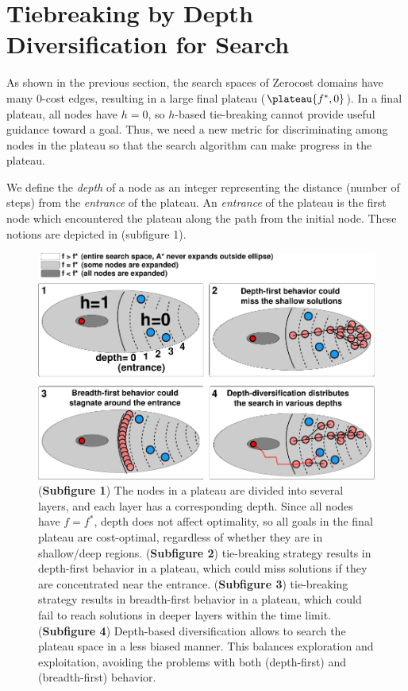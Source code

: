 
\chapter[Depth Diversification]{Tiebreaking by Depth Diversification for \astar Search}

\label{chap:tiebreaking}

As shown in the previous section, the search spaces of Zerocost domains have many 0-cost edges,
resulting in a large final plateau ($\plateau{f^*,0}$). In a final plateau,
all nodes have $h=0$, so $h$-based tie-breaking cannot provide
useful guidance toward a goal. Thus, we need a new metric for discriminating among nodes
in the plateau so that the search algorithm can make progress in the plateau.

We define the \emph{depth} of a node as an 
integer representing the distance (number of steps) from the
\emph{entrance} of the plateau.  An \emph{entrance} of the plateau is
the first node which encountered the plateau along the path from the
initial node. These notions are depicted in
 (subfigure 1). 

\begin{figure}[htbp]
  \centering
  \includegraphics[width=\textwidth]{img/astar/plateau-2.pdf}
 \caption{(\textbf{Subfigure 1}) The nodes in a plateau are divided into several layers, and each layer has a corresponding depth. Since all nodes have $f=f^*$, depth does not affect optimality, so all
goals in the final plateau are cost-optimal, regardless of whether they are in shallow/deep regions.
 (\textbf{Subfigure 2}) \lifo tie-breaking strategy results in depth-first behavior in a
 plateau, which could miss solutions if they are concentrated near the entrance.
 (\textbf{Subfigure 3}) \fifo tie-breaking strategy results in  breadth-first behavior in a
 plateau, which could fail to reach solutions in deeper layers within the time limit.
 (\textbf{Subfigure 4}) Depth-based diversification allows \astar to search the plateau space
 in a less biased manner. This balances exploration and exploitation, avoiding the problems with both \lifo (depth-first) and \fifo (breadth-first) behavior.
 }
 \label{fig:plateau-depiction}
\end{figure}

